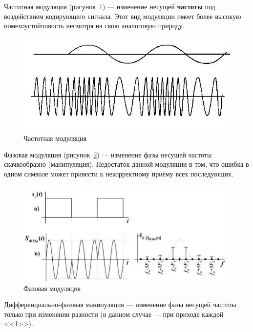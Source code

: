 Частотная модуляция (рисунок~\ref{fig:fm}) --- изменение несущей \textbf{частоты} под воздействием кодирующего сигнала. Этот вид модуляции имеет более высокую помехоустойчивость несмотря на свою аналоговую природу.

\begin{figure}[ht]
    \includegraphics[width=.8\linewidth]{Figures/fm.jpg}
    \caption{Частотная модуляция}
    \label{fig:fm}
\end{figure}

Фазовая модуляция (рисунок~\ref{fig:pm}) --- изменение фазы несущей частоты скачкообразно (манипуляция). Недостаток данной модуляции в том, что ошибка в одном символе может привести к некорректному приёму всех последующих.

\begin{figure}[ht]
    \includegraphics[width=.8\linewidth]{Figures/pm.jpg}
    \caption{Фазовая модуляция}
    \label{fig:pm}
\end{figure}

Дифференциально-фазовая манипуляция --- изменение фазы несущей частоты только при изменении разности (в данном случае --- при приходе каждой <<1>>).

